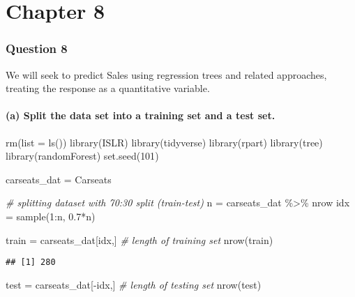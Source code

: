 \documentclass[
]{article}
\newenvironment{Shaded}{\begin{snugshade}}{\end{snugshade}}
\newcommand{\AttributeTok}[1]{\textcolor[rgb]{0.77,0.63,0.00}{#1}}
\newcommand{\CommentTok}[1]{\textcolor[rgb]{0.56,0.35,0.01}{\textit{#1}}}
\newcommand{\DecValTok}[1]{\textcolor[rgb]{0.00,0.00,0.81}{#1}}
\newcommand{\FloatTok}[1]{\textcolor[rgb]{0.00,0.00,0.81}{#1}}
\newcommand{\FunctionTok}[1]{\textcolor[rgb]{0.00,0.00,0.00}{#1}}
\newcommand{\NormalTok}[1]{#1}
\newcommand{\OtherTok}[1]{\textcolor[rgb]{0.56,0.35,0.01}{#1}}
\newcommand{\SpecialCharTok}[1]{\textcolor[rgb]{0.00,0.00,0.00}{#1}}
\begin{document}
\hypertarget{chapter-8}{%
\section{Chapter 8}\label{chapter-8}}

\hypertarget{question-8}{%
\subsubsection{Question 8}\label{question-8}}

We will seek to predict Sales using regression trees and related
approaches, treating the response as a quantitative variable.

\hypertarget{a-split-the-data-set-into-a-training-set-and-a-test-set.-1}{%
\paragraph{(a) Split the data set into a training set and a test
set.}\label{a-split-the-data-set-into-a-training-set-and-a-test-set.-1}}

\begin{Shaded}
\begin{Highlighting}[]
\FunctionTok{rm}\NormalTok{(}\AttributeTok{list =} \FunctionTok{ls}\NormalTok{())}
\FunctionTok{library}\NormalTok{(ISLR)}
\FunctionTok{library}\NormalTok{(tidyverse)}
\FunctionTok{library}\NormalTok{(rpart)}
\FunctionTok{library}\NormalTok{(tree)}
\FunctionTok{library}\NormalTok{(randomForest)}
\FunctionTok{set.seed}\NormalTok{(}\DecValTok{101}\NormalTok{)}

\NormalTok{carseats\_dat }\OtherTok{=}\NormalTok{ Carseats}

\CommentTok{\# splitting dataset with 70:30 split (train{-}test)}
\NormalTok{n }\OtherTok{=}\NormalTok{ carseats\_dat }\SpecialCharTok{\%\textgreater{}\%}\NormalTok{ nrow}
\NormalTok{idx }\OtherTok{=} \FunctionTok{sample}\NormalTok{(}\DecValTok{1}\SpecialCharTok{:}\NormalTok{n, }\FloatTok{0.7}\SpecialCharTok{*}\NormalTok{n)}


\NormalTok{train }\OtherTok{=}\NormalTok{ carseats\_dat[idx,]}
\CommentTok{\# length of training set}
\FunctionTok{nrow}\NormalTok{(train)}
\end{Highlighting}
\end{Shaded}

\begin{verbatim}
## [1] 280
\end{verbatim}

\begin{Shaded}
\begin{Highlighting}[]
\NormalTok{test }\OtherTok{=}\NormalTok{ carseats\_dat[}\SpecialCharTok{{-}}\NormalTok{idx,]}
\CommentTok{\# length of testing set}
\FunctionTok{nrow}\NormalTok{(test)}
\end{Highlighting}
\end{Shaded}
\end{document}
